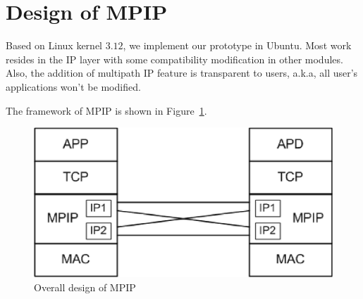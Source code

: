 \section{Design of MPIP}
\label{sec:design}
Based on Linux kernel $3.12$, we implement our prototype in Ubuntu. Most work resides in the IP layer with some compatibility modification in other modules. Also, the addition of multipath IP feature is transparent to users, a.k.a, all user's applications won't be modified.

The framework of MPIP is shown in Figure~\ref{fig.arch}. 
\begin{figure}
\centering
\includegraphics[width=0.8\linewidth]{fig/arch.eps}
\caption{Overall design of MPIP}
\label{fig.arch}
\end{figure}

